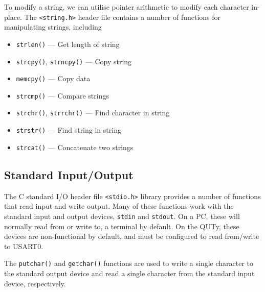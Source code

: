 \documentclass[a4paper]{report}
\begin{document}
To modify a string, we can utilise pointer arithmetic to modify each character in-place.
The \texttt{<string.h>} header file contains a number of functions for manipulating strings, including
\begin{itemize}
    \item \texttt{strlen()} --- Get length of string
    \item \texttt{strcpy()}, \texttt{strncpy()} --- Copy string
    \item \texttt{memcpy()} --- Copy data
    \item \texttt{strcmp()} --- Compare strings
    \item \texttt{strchr()}, \texttt{strrchr()} --- Find character in string
    \item \texttt{strstr()} --- Find string in string
    \item \texttt{strcat()} --- Concatenate two strings
\end{itemize}
\subsection{Standard Input/Output}
The C standard I/O header file \texttt{<stdio.h>} library provides a number of functions that read input
and write output. Many of these functions work with the standard input and output devices, \texttt{stdin} and \texttt{stdout}.
On a PC, these will normally read from or write to, a terminal by default. On the QUTy, these devices are non-functional by default, and must be
configured to read from/write to USART0.

The \texttt{putchar()} and \texttt{getchar()} functions are used to write a single character to the standard output device and read a single character from the standard input device, respectively.
\end{document}
